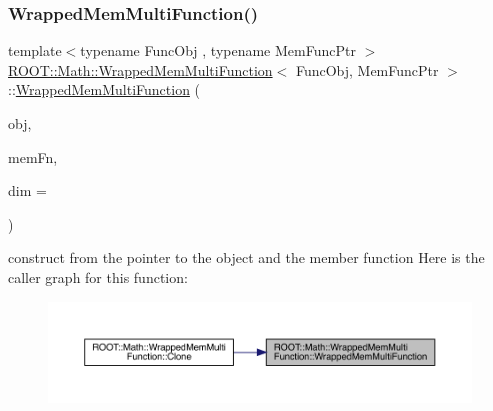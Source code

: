\subsubsection{\texorpdfstring{WrappedMemMultiFunction()}{WrappedMemMultiFunction()}\hspace{0.1cm}{\footnotesize\ttfamily [1/2]}}
{\footnotesize\ttfamily template$<$typename Func\+Obj , typename Mem\+Func\+Ptr $>$ \\
\mbox{\hyperlink{classROOT_1_1Math_1_1WrappedMemMultiFunction}{R\+O\+O\+T\+::\+Math\+::\+Wrapped\+Mem\+Multi\+Function}}$<$ Func\+Obj, Mem\+Func\+Ptr $>$\+::\mbox{\hyperlink{classROOT_1_1Math_1_1WrappedMemMultiFunction}{Wrapped\+Mem\+Multi\+Function}} (\begin{DoxyParamCaption}\item[{Func\+Obj \&}]{obj,  }\item[{Mem\+Func\+Ptr}]{mem\+Fn,  }\item[{unsigned int}]{dim = {} }\end{DoxyParamCaption})\hspace{0.3cm}{\ttfamily [inline]}}

construct from the pointer to the object and the member function Here is the caller graph for this function\+:\nopagebreak
\begin{figure}[H]
\begin{center}
\leavevmode
\includegraphics[width=350pt]{d3/dd9/classROOT_1_1Math_1_1WrappedMemMultiFunction_a611b693f11a43c474d2292e7aadb0811_icgraph}
\end{center}
\end{figure}
\mbox{\label{classROOT_1_1Math_1_1WrappedMemMultiFunction_a611b693f11a43c474d2292e7aadb0811}} 
